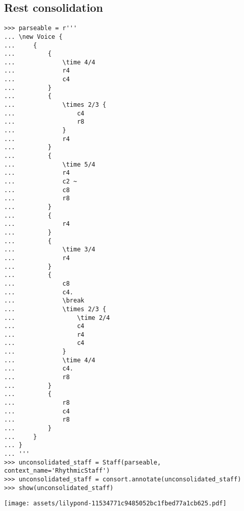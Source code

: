 \subsection{Rest consolidation}

\begin{comment}
<abjad>
parseable = r'''
\new Voice {
    {
        {
            \time 4/4
            r4
            c4
        }
        {
            \times 2/3 {
                c4
                r8
            }
            r4
        }
        {
            \time 5/4
            r4
            c2 ~
            c8
            r8
        }
        {
            r4
        }
        {
            \time 3/4
            r4
        }
        {
            c8
            c4.
            \break
            \times 2/3 {
                \time 2/4
                c4
                r4
                c4
            }
            \time 4/4
            c4.
            r8
        }
        {
            r8
            c4
            r8
        }
    }
}
'''
unconsolidated_staff = Staff(parseable, context_name='RhythmicStaff')
unconsolidated_staff = consort.annotate(unconsolidated_staff)
show(unconsolidated_staff)
</abjad>
\end{comment}

\begin{singlespacing}
\vspace{-0.5\baselineskip}
\begin{lstlisting}
>>> parseable = r'''
... \new Voice {
...     {
...         {
...             \time 4/4
...             r4
...             c4
...         }
...         {
...             \times 2/3 {
...                 c4
...                 r8
...             }
...             r4
...         }
...         {
...             \time 5/4
...             r4
...             c2 ~
...             c8
...             r8
...         }
...         {
...             r4
...         }
...         {
...             \time 3/4
...             r4
...         }
...         {
...             c8
...             c4.
...             \break
...             \times 2/3 {
...                 \time 2/4
...                 c4
...                 r4
...                 c4
...             }
...             \time 4/4
...             c4.
...             r8
...         }
...         {
...             r8
...             c4
...             r8
...         }
...     }
... }
... '''
>>> unconsolidated_staff = Staff(parseable, context_name='RhythmicStaff')
>>> unconsolidated_staff = consort.annotate(unconsolidated_staff)
>>> show(unconsolidated_staff)
\end{lstlisting}
\noindent\texttt{[image: assets/lilypond-11534771c9485052bc1fbed77a1cb625.pdf]}
\end{singlespacing}


